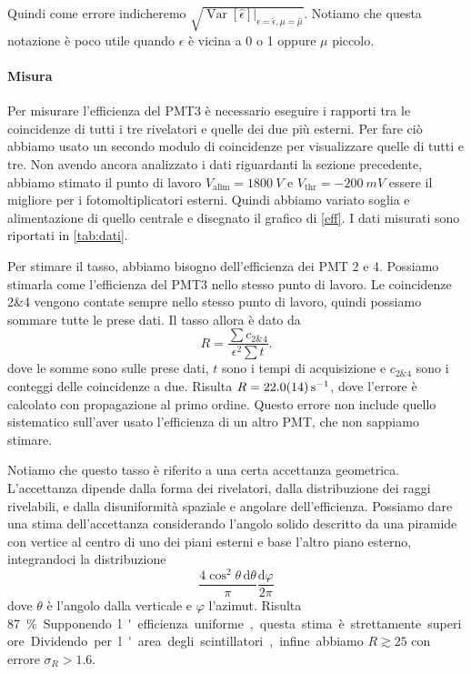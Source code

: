 \documentclass[a4paper]{article}
\newcommand*\de{\mathrm{d}}
\begin{document}
Quindi come errore indicheremo $\sqrt{\operatorname{Var}[\hat\epsilon]\big|_{\epsilon=\hat\epsilon,\mu=\hat\mu}}$.
Notiamo che questa notazione è poco utile quando $\epsilon$ è vicina a 0 o 1 oppure $\mu$ piccolo.

\paragraph{Misura}

Per misurare l'efficienza del PMT3 è necessario eseguire i rapporti tra le coincidenze di tutti i tre rivelatori e quelle dei due più esterni. Per fare ciò abbiamo usato un secondo modulo di coincidenze per visualizzare quelle di tutti e tre. Non avendo ancora analizzato i dati riguardanti la sezione precedente, abbiamo stimato il punto di lavoro $V_\text{alim}=\SI{1800}{V}$ e $V_{\text{thr}}=\SI{-200}{mV}$ essere il migliore per i fotomoltiplicatori esterni. Quindi abbiamo variato soglia e alimentazione di quello centrale e disegnato il grafico di \autoref{eff}.
I dati misurati sono riportati in \autoref{tab:dati}.

Per stimare il tasso, abbiamo bisogno dell'efficienza dei PMT 2 e 4.
Possiamo stimarla come l'efficienza del PMT3 nello stesso punto di lavoro.
Le coincidenze 2\&4 vengono contate sempre nello stesso punto di lavoro,
quindi possiamo sommare tutte le prese dati.
Il tasso allora è dato da
\begin{equation*}
	R = \frac{\sum c_{2\&4}}{\epsilon^2 \sum t}.
\end{equation*}
dove le somme sono sulle prese dati,
$t$ sono i tempi di acquisizione
e $c_{2\&4}$ sono i conteggi delle coincidenze a due.
Risulta $R=\SI{22.0 \pm 1.4}{s^{-1}}$,
dove l'errore è calcolato con propagazione al primo ordine.
Questo errore non include quello sistematico sull'aver usato l'efficienza di un altro PMT,
che non sappiamo stimare.

Notiamo che questo tasso è riferito a una certa accettanza geometrica.
L'accettanza dipende dalla forma dei rivelatori,
dalla distribuzione dei raggi rivelabili,
e dalla disuniformità spaziale e angolare dell'efficienza.
Possiamo dare una stima dell'accettanza considerando l'angolo solido
descritto da una piramide con vertice al centro di uno dei piani esterni e base l'altro piano esterno,
integrandoci la distribuzione
\[\frac{4\cos^2\theta\,\de\theta}{\pi}\frac{\de\varphi}{2\pi}\]
dove $\theta$ è l'angolo dalla verticale e $\varphi$ l'azimut.
Risulta \SI{87}\%.
Supponendo l'efficienza uniforme,
questa stima è strettamente superiore.
Dividendo per l'area degli scintillatori, infine abbiamo
$R \gtrsim 25$ con errore $\sigma_R>1.6$.
\end{document}
